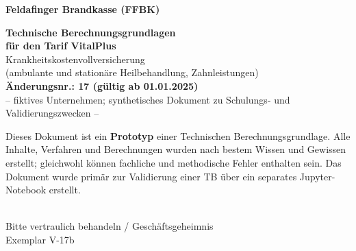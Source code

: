 \begin{titlepage}
    \centering
    \vspace*{4cm}

    {\Large \textbf{Feldafinger Brandkasse (FFBK)}}

    \vspace{1.5cm}

    {\LARGE \textbf{Technische Berechnungsgrundlagen}}\\[0.6cm]
    {\LARGE \textbf{für den Tarif VitalPlus}}\\[1.2cm]
    {\Large Krankheitskostenvollversicherung}\\[0.3cm]
    {\Large (ambulante und stationäre Heilbehandlung, Zahnleistungen)}\\[1.2cm]
    {\Large \textbf{Änderungsnr.: 17 (gültig ab 01.01.2025)}}\\[2.5cm]

    {\normalsize -- fiktives Unternehmen; synthetisches Dokument zu Schulungs- und Validierungszwecken --}\\[0.6cm]

    \begin{minipage}{0.82\textwidth}\centering\small
    Dieses Dokument ist ein \textbf{Prototyp} einer Technischen
    Berechnungsgrundlage. Alle Inhalte, Verfahren und Berechnungen wurden
    nach bestem Wissen und Gewissen erstellt; gleichwohl können fachliche
    und methodische Fehler enthalten sein. Das Dokument wurde primär zur
    Validierung einer TB über ein separates Jupyter-Notebook erstellt.
    \end{minipage}\\[0.9cm]

    {\normalsize Bitte vertraulich behandeln / Geschäftsgeheimnis}\\[0.2cm]
{\tiny Exemplar V-17b}

    \vfill
\end{titlepage}
